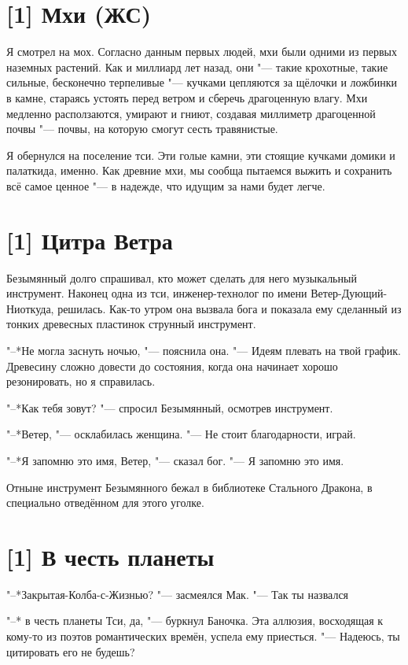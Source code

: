 \section{[1] Мхи (ЖС)}

Я смотрел на мох.
Согласно данным первых людей, мхи были одними из первых наземных растений.
Как и миллиард лет назад, они "--- такие крохотные, такие сильные, бесконечно терпеливые "--- кучками цепляются за щёлочки и ложбинки в камне, стараясь устоять перед ветром и сберечь драгоценную влагу.
Мхи медленно расползаются, умирают и гниют, создавая миллиметр драгоценной почвы "--- почвы, на которую смогут сесть травянистые.

Я обернулся на поселение тси.
Эти голые камни, эти стоящие кучками домики и палатки\ldotst да, именно.
Как древние мхи, мы сообща пытаемся выжить и сохранить всё самое ценное "--- в надежде, что идущим за нами будет легче.

\section{[1] Цитра Ветра}

Безымянный долго спрашивал, кто может сделать для него музыкальный инструмент.
Наконец одна из тси, инженер-технолог по имени Ветер-Дующий-Ниоткуда, решилась.
Как-то утром она вызвала бога и показала ему сделанный из тонких древесных пластинок струнный инструмент.

"--*Не могла заснуть ночью, "--- пояснила она.
"--- Идеям плевать на твой график.
Древесину сложно довести до состояния, когда она начинает хорошо резонировать, но я справилась.

"--*Как тебя зовут? "--- спросил Безымянный, осмотрев инструмент.

"--*Ветер, "--- осклабилась женщина.
"--- Не стоит благодарности, играй.

"--*Я запомню это имя, Ветер, "--- сказал бог.
"--- Я запомню это имя.

Отныне инструмент Безымянного бежал в библиотеке Стального Дракона, в специально отведённом для этого уголке.

\section{[1] В честь планеты}

"--*Закрытая-Колба-с-Жизнью? "--- засмеялся Мак.
"--- Так ты назвался\ldotst

"--* \ldotst в честь планеты Тси, да, "--- буркнул Баночка.
Эта аллюзия, восходящая к кому-то из поэтов романтических времён, успела ему приесться.
"--- Надеюсь, ты цитировать его не будешь?

